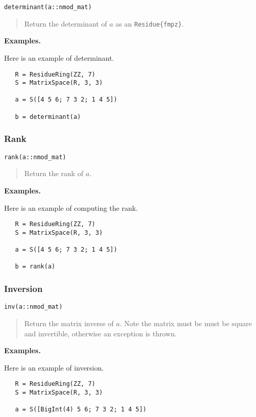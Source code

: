 \documentclass[a4paper,10pt]{article}
\newcommand{\code}{\lstinline}
\newcommand{\desc}[1]{\vspace{-3mm}\begin{quote}#1\end{quote}}
\begin{document}
{{\begin{lstlisting}
determinant(a::nmod_mat)
\end{lstlisting}

\desc{Return the determinant of $a$ as an \code|Residue{fmpz}|.}

\textbf{Examples.}

Here is an example of determinant.

\begin{lstlisting}
   R = ResidueRing(ZZ, 7)
   S = MatrixSpace(R, 3, 3)

   a = S([4 5 6; 7 3 2; 1 4 5])

   b = determinant(a)
\end{lstlisting}

\subsubsection{Rank}

\begin{lstlisting}
rank(a::nmod_mat)
\end{lstlisting}

\desc{Return the rank of $a$.}

\textbf{Examples.}

Here is an example of computing the rank.

\begin{lstlisting}
   R = ResidueRing(ZZ, 7)
   S = MatrixSpace(R, 3, 3)

   a = S([4 5 6; 7 3 2; 1 4 5])

   b = rank(a)
\end{lstlisting}

\subsubsection{Inversion}

\begin{lstlisting}
inv(a::nmod_mat)
\end{lstlisting}

\desc{Return the matrix inverse of $a$. Note the matrix must be must be square and
invertible, otherwise an exception is thrown.}

\textbf{Examples.}

Here is an example of inversion.

\begin{lstlisting}
   R = ResidueRing(ZZ, 7)
   S = MatrixSpace(R, 3, 3)

   a = S([BigInt(4) 5 6; 7 3 2; 1 4 5])


\end{lstlisting}}}
\end{document}
